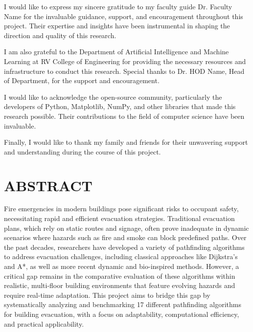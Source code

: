 \documentclass[11pt,a4paper]{report}
\begin{document}
I would like to express my sincere gratitude to my faculty guide Dr. Faculty Name for the invaluable guidance, support, and encouragement throughout this project. Their expertise and insights have been instrumental in shaping the direction and quality of this research.

\vspace{0.5cm}

I am also grateful to the Department of Artificial Intelligence and Machine Learning at RV College of Engineering for providing the necessary resources and infrastructure to conduct this research. Special thanks to Dr. HOD Name, Head of Department, for the support and encouragement.

\vspace{0.5cm}

I would like to acknowledge the open-source community, particularly the developers of Python, Matplotlib, NumPy, and other libraries that made this research possible. Their contributions to the field of computer science have been invaluable.

\vspace{0.5cm}

Finally, I would like to thank my family and friends for their unwavering support and understanding during the course of this project.

\vspace{0.3cm}
\chapter*{ABSTRACT}

Fire emergencies in modern buildings pose significant risks to occupant safety, necessitating rapid and efficient evacuation strategies. Traditional evacuation plans, which rely on static routes and signage, often prove inadequate in dynamic scenarios where hazards such as fire and smoke can block predefined paths. Over the past decades, researchers have developed a variety of pathfinding algorithms to address evacuation challenges, including classical approaches like Dijkstra's and A*, as well as more recent dynamic and bio-inspired methods. However, a critical gap remains in the comparative evaluation of these algorithms within realistic, multi-floor building environments that feature evolving hazards and require real-time adaptation. This project aims to bridge this gap by systematically analyzing and benchmarking 17 different pathfinding algorithms for building evacuation, with a focus on adaptability, computational efficiency, and practical applicability.
\end{document}
